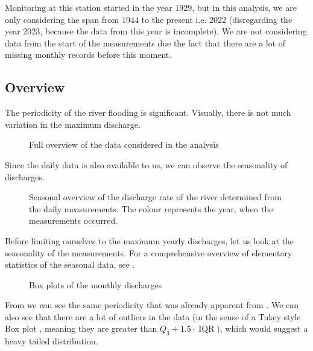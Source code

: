 Monitoring at this station started in the year 1929, but in this analysis, we are only considering the 
span from 1944 to the present i.e. 2022 (disregarding the year 2023, because the data from this year is incomplete). 
We are not considering data from the start of the measurements due the fact that there are a lot of missing monthly records before this moment.

\subsection{Overview}%
\label{sub:overview}
The periodicity of the river flooding is significant. Visually, there is not much variation in the maximum discharge.

\begin{figure}[H]
    \centering
    \caption{Full overview of the data considered in the analysis}
    \label{fig:full_mothly_overview}
 \end{figure}

Since the daily data is also available to us, we can observe the seasonality of discharges.

\begin{figure}[hbt]
    \centering
    \caption{Seasonal overview of the discharge rate of the river determined from the daily measurements. The colour
        represents the year, when the measurements occurred.}
    \label{fig:seasonality_of_discharges}
 \end{figure}

\begin{table}[h!]
    \centering
    
    \caption{Elementary statistics of the data grouped by months}
    \label{tab:month_stats}
\end{table}
  
 Before limiting ourselves to the maximum yearly discharges, let us look at the seasonality of the measurements. 
 For a comprehensive overview of elementary statistics of the seasonal data, see .

 \begin{figure}[hbt]
     \centering
     \caption{Box plots of the monthly discharges}
     \label{fig:month_box_plots}
 \end{figure}

 From  we can see the same periodicity that was already apparent from
 . We can also see that there are a lot of
 outliers in the data (in the sense of a Tukey style Box plot \cite{mcgillVariationsBoxPlots1978}, meaning they are
 greater than \(Q_3 + 1.5 \cdot \mathop{IQR}\)), which would suggest a heavy tailed distribution.

